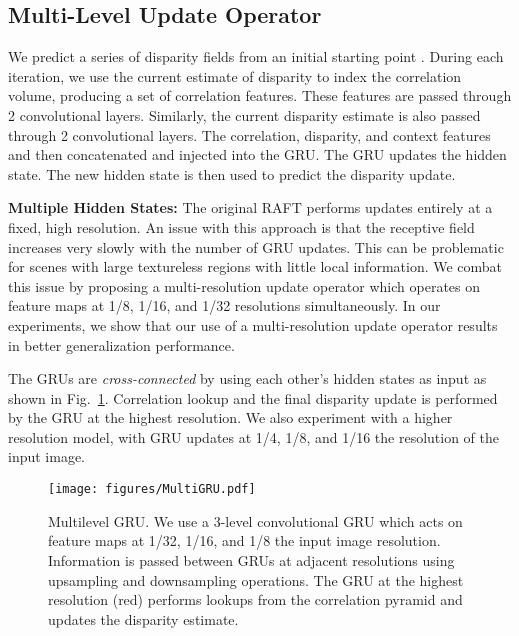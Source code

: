 \documentclass[10pt,twocolumn,letterpaper]{article}
\begin{document}
\subsection{Multi-Level Update Operator}
\label{sec:updates}

We predict a series of disparity fields  from an initial starting point . During each iteration, we use the current estimate of disparity to index the correlation volume, producing a set of correlation features. These features are passed through 2 convolutional layers. Similarly, the current disparity estimate is also passed through 2 convolutional layers. The correlation, disparity, and context features and then concatenated and injected into the GRU. The GRU updates the hidden state. The new hidden state is then used to predict the disparity update.  \smallskip


\noindent\textbf{Multiple Hidden States:} The original RAFT performs updates entirely at a fixed, high resolution. An issue with this approach is that the receptive field increases very slowly with the number of GRU updates. This can be problematic for scenes with large textureless regions with little local information. We combat this issue by proposing a multi-resolution update operator which operates on feature maps at 1/8, 1/16, and 1/32 resolutions simultaneously. In our experiments, we show that our use of a multi-resolution update operator results in better generalization performance. 

The GRUs are \textit{cross-connected} by using each other's hidden states as input as shown in Fig.~\ref{fig:multileveldiagram}. Correlation lookup and the final disparity update is performed by the GRU at the highest resolution. We also experiment with a higher resolution model, with GRU updates at 1/4, 1/8, and 1/16 the resolution of the input image.


\begin{figure}[t]
    \centering
	\texttt{[image: figures/MultiGRU.pdf]}
	\caption{Multilevel GRU. We use a 3-level convolutional GRU which acts on feature maps at 1/32, 1/16, and 1/8 the input image resolution. Information is passed between GRUs at adjacent resolutions using upsampling and downsampling operations. The GRU at the highest resolution (red) performs lookups from the correlation pyramid and updates the disparity estimate.}\vspace{-0.5cm}
	\label{fig:multileveldiagram}
\end{figure}
\end{document}
